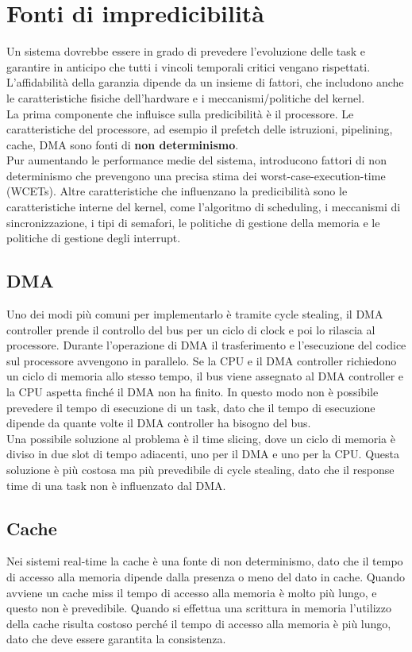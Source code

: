 \documentclass[12pt,openany,onesided]{book}
\begin{document}
\chapter{Fonti di impredicibilità}
Un sistema dovrebbe essere in grado di prevedere l'evoluzione delle task e garantire in anticipo che tutti i vincoli temporali critici 
vengano rispettati.
L'affidabilità della garanzia dipende da un insieme di fattori, che includono anche le caratteristiche fisiche dell'hardware e 
i meccanismi/politiche del kernel.
\\
La prima componente che influisce sulla predicibilità è il processore. Le caratteristiche del processore, ad esempio il prefetch delle istruzioni, 
pipelining, cache, DMA sono fonti di \textbf{non determinismo}.
\\
Pur aumentando le performance medie del sistema, introducono fattori di non determinismo che prevengono una precisa stima dei worst-case-execution-time (WCETs).
Altre caratteristiche che influenzano la predicibilità sono le caratteristiche interne del kernel, come l'algoritmo di scheduling, i meccanismi di sincronizzazione, 
i tipi di semafori, le politiche di gestione della memoria e le politiche di gestione degli interrupt.
\section{DMA}
Uno dei modi più comuni per implementarlo è tramite cycle stealing, il DMA controller prende il controllo del bus per un ciclo di clock 
e poi lo rilascia al processore.
Durante l'operazione di DMA il trasferimento e l'esecuzione del codice sul processore avvengono in parallelo.
Se la CPU e il DMA controller richiedono un ciclo di memoria allo stesso tempo, il bus viene assegnato al DMA controller e la CPU
aspetta finché il DMA non ha finito.
In questo modo non è possibile prevedere il tempo di esecuzione di un task, dato che il tempo di esecuzione dipende da quante volte il DMA controller ha bisogno del bus.
\\
Una possibile soluzione al problema è il time slicing, dove un ciclo di memoria è diviso in due slot di tempo adiacenti, uno per il DMA e uno per la CPU.
Questa soluzione è più costosa ma più prevedibile di cycle stealing, dato che il response time di una task non è influenzato dal DMA.
\section{Cache}
Nei sistemi real-time la cache è una fonte di non determinismo, dato che il tempo di accesso alla memoria dipende dalla presenza o meno del dato in cache.
Quando avviene un cache miss il tempo di accesso alla memoria è molto più lungo, e questo non è prevedibile.
Quando si effettua una scrittura in memoria l'utilizzo della cache risulta costoso perché il tempo di accesso alla memoria è più lungo, dato che deve essere garantita la consistenza.
\end{document}
